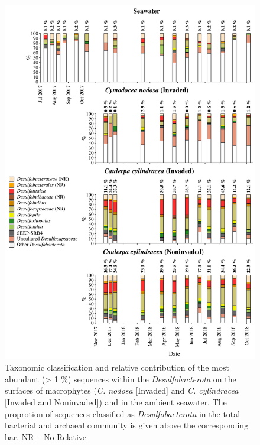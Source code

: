 \documentclass[12pt,]{article}
\begin{document}
\begin{figure}[H]

{\centering \includegraphics[width=0.85\linewidth]{../results/figures/desulfobacterota_bar_plot} 

}

\caption{Taxonomic classification and relative contribution of the most abundant (> 1 \si{\percent}) sequences within the \textit{Desulfobacterota} on the surfaces of macrophytes (\textit{C. nodosa} [Invaded] and \textit{C. cylindracea} [Invaded and Noninvaded]) and in the ambient seawater. The proprotion of sequences classified as \textit{Desulfobacterota} in the total bacterial and archaeal community is given above the corresponding bar. NR -- No Relative\label{desulfo}}\label{fig:unnamed-chunk-9}
\end{figure}
\end{document}
